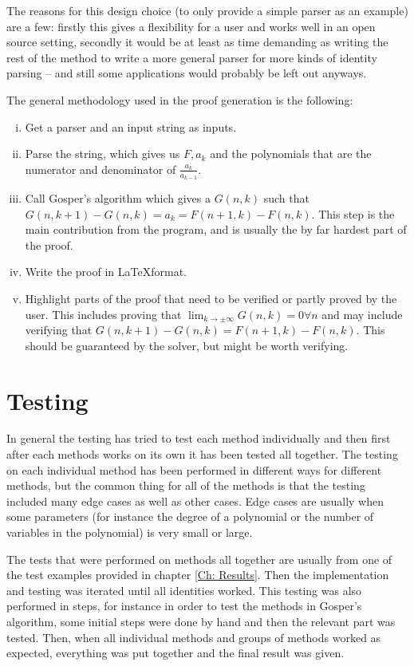 The reasons for this design choice (to only provide a simple parser as an example) are a few: firstly this gives a flexibility for a user and works well in an open source setting, secondly it would be at least as time demanding as writing the rest of the method to write a more general parser for more kinds of identity parsing -- and still some applications would probably be left out anyways.

The general methodology used in the proof generation is the following:
\begin{enumerate}[i)]
  \item Get a parser and an input string as inputs.
  \item Parse the string, which gives us $F,a_k$ and the polynomials that are the numerator and denominator of $\frac{a_k}{a_{k-1}}$.
  \item Call Gosper's algorithm which gives a $G(n,k)$ such that $G(n,k+1)-G(n,k)=a_k=F(n+1,k)-F(n,k)$. This step is the main contribution from the program, and is usually the by far hardest part of the proof.
  \item Write the proof in \LaTeX format.
  \item Highlight parts of the proof that need to be verified or partly proved by the user. This includes proving that $\lim_{k\to\pm\infty}G(n,k)=0\forall n$ and may include verifying that $G(n,k+1)-G(n,k)=F(n+1,k)-F(n,k)$. This should be guaranteed by the solver, but might be worth verifying.
\end{enumerate}
\section{Testing}
In general the testing has tried to test each method individually and then first after each methods works on its own it has been tested all together. The testing on each individual method has been performed in different ways for different methods, but the common thing for all of the methods is that the testing included many edge cases as well as other cases. Edge cases are usually when some parameters (for instance the degree of a polynomial or the number of variables in the polynomial) is very small or large.

The tests that were performed on methods all together are usually from one of the test examples provided in chapter \ref{Ch: Results}. Then the implementation and testing was iterated until all identities worked. This testing was also performed in steps, for instance in order to test the methods in Gosper's algorithm, some initial steps were done by hand and then the relevant part was tested. Then, when all individual methods and groups of methods worked as expected, everything was put together and the final result was given.
